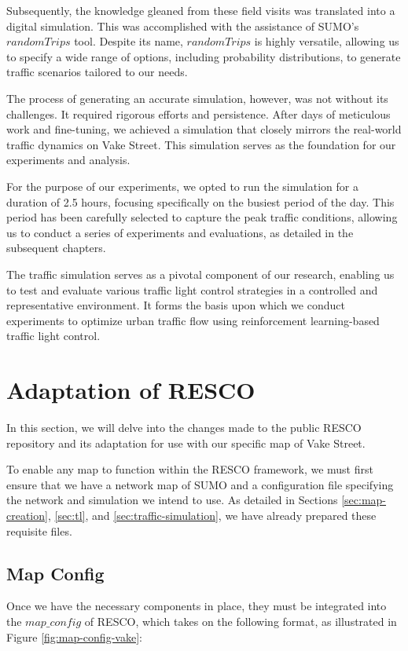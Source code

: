 Subsequently, the knowledge gleaned from these field visits was translated into a digital simulation. This was accomplished with the assistance of SUMO's $randomTrips$ tool. Despite its name, $randomTrips$ is highly versatile, allowing us to specify a wide range of options, including probability distributions, to generate traffic scenarios tailored to our needs.

The process of generating an accurate simulation, however, was not without its challenges. It required rigorous efforts and persistence. After days of meticulous work and fine-tuning, we achieved a simulation that closely mirrors the real-world traffic dynamics on Vake Street. This simulation serves as the foundation for our experiments and analysis.

For the purpose of our experiments, we opted to run the simulation for a duration of 2.5 hours, focusing specifically on the busiest period of the day. This period has been carefully selected to capture the peak traffic conditions, allowing us to conduct a series of experiments and evaluations, as detailed in the subsequent chapters.

The traffic simulation serves as a pivotal component of our research, enabling us to test and evaluate various traffic light control strategies in a controlled and representative environment. It forms the basis upon which we conduct experiments to optimize urban traffic flow using reinforcement learning-based traffic light control.


\section{Adaptation of RESCO}
In this section, we will delve into the changes made to the public RESCO repository and its adaptation for use with our specific map of Vake Street.

To enable any map to function within the RESCO framework, we must first ensure that we have a network map of SUMO and a configuration file specifying the network and simulation we intend to use. As detailed in Sections \ref{sec:map-creation}, \ref{sec:tl}, and \ref{sec:traffic-simulation}, we have already prepared these requisite files.

\subsection{Map Config}
Once we have the necessary components in place, they must be integrated into the $map\_config$ of RESCO, which takes on the following format, as illustrated in Figure \ref{fig:map-config-vake}:

